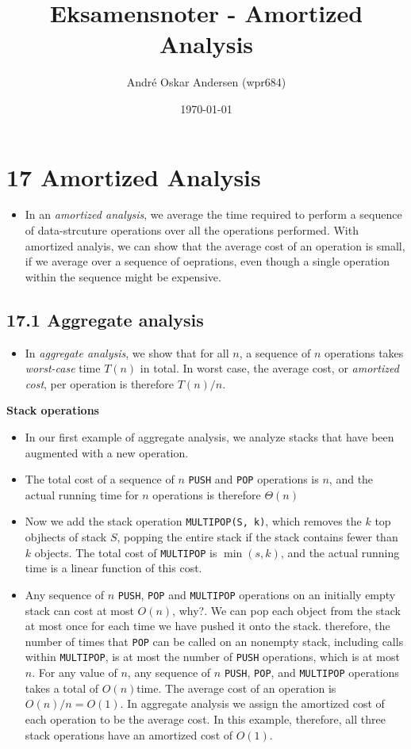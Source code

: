 \documentclass{report}
\title{Eksamensnoter - Amortized Analysis}
\author{André Oskar Andersen (wpr684)}
\date{\today}
\begin{document}
\maketitle

\section*{17 Amortized Analysis}
\begin{itemize}
    \item In an \textit{amortized analysis}, we average the time required to perform a sequence of data-strcuture operations over all the operations performed. With amortized analyis, we can show that the average cost of an operation is small, if we average over a sequence of oeprations, even though a single operation within the sequence might be expensive.
\end{itemize}
\subsection*{17.1 Aggregate analysis}
\begin{itemize}
    \item In \textit{aggregate analysis}, we show that for all $n$, a sequence of $n$ operations takes \textit{worst-case} time $T(n)$ in total. In worst case, the average cost, or \textit{amortized cost}, per operation is therefore $T(n)/n$.
\end{itemize}
\textbf{Stack operations}
\begin{itemize}
    \item In our first example of aggregate analysis, we analyze stacks that have been augmented with a new operation.
    \item The total cost of a sequence of $n$ \texttt{PUSH} and \texttt{POP} operations is $n$, and the actual running time for $n$ operations is therefore $\Theta(n)$
    \item Now we add the stack operation \texttt{MULTIPOP(S, k)}, which removes the $k$ top objhects of stack $S$, popping the entire stack if the stack contains fewer than $k$ objects. The total cost of \texttt{MULTIPOP} is $\min(s, k)$, and the actual running time is a linear function of this cost.
    \item Any sequence of $n$ \texttt{PUSH}, \texttt{POP} and \texttt{MULTIPOP} operations on an initially empty stack can cost at most $O(n)$, why?. We can pop each object from the stack at most once for each time we have pushed it onto the stack. therefore, the number of times that \texttt{POP} can be called on an nonempty stack, including calls within \texttt{MULTIPOP}, is at most the number of \texttt{PUSH} operations, which is at most $n$. For any value of $n$, any sequence of $n$ \texttt{PUSH}, \texttt{POP}, and \texttt{MULTIPOP} operations takes a total of $O(n)$time. The average cost of an operation is $O(n)/n = O(1)$. In aggregate analysis we assign the amortized cost of each operation to be the average cost. In this example, therefore, all three stack operations have an amortized cost of $O(1)$.
\end{itemize}
\end{document}
